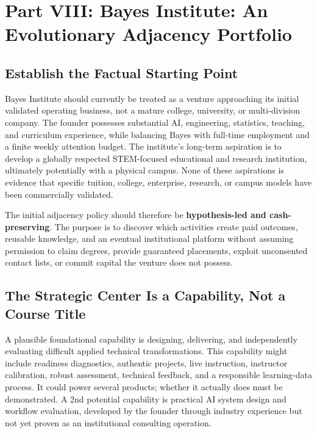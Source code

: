 \section*{Part VIII: Bayes Institute: An Evolutionary Adjacency Portfolio}
\label{sec:part8_bayes_institute_evolutionary_portfolio}

\subsection{Establish the Factual Starting Point}
\label{sec:bayes_factual_starting_point}

Bayes Institute should currently be treated as a venture approaching its initial validated operating business, not a mature college, university, or multi-division company. The founder possesses substantial AI, engineering, statistics, teaching, and curriculum experience, while balancing Bayes with full-time employment and a finite weekly attention budget. The institute's long-term aspiration is to develop a globally respected STEM-focused educational and research institution, ultimately potentially with a physical campus. None of these aspirations is evidence that specific tuition, college, enterprise, research, or campus models have been commercially validated.

The initial adjacency policy should therefore be \textbf{hypothesis-led and cash-preserving}. The purpose is to discover which activities create paid outcomes, reusable knowledge, and an eventual institutional platform without assuming permission to claim degrees, provide guaranteed placements, exploit unconsented contact lists, or commit capital the venture does not possess.

\subsection{The Strategic Center Is a Capability, Not a Course Title}
\label{sec:strategic_center_capability_not_title}

A plausible foundational capability is designing, delivering, and independently evaluating difficult applied technical transformations. This capability might include readiness diagnostics, authentic projects, live instruction, instructor calibration, robust assessment, technical feedback, and a responsible learning-data process. It could power several products; whether it actually does must be demonstrated. A 2nd potential capability is practical AI system design and workflow evaluation, developed by the founder through industry experience but not yet proven as an institutional consulting operation.


